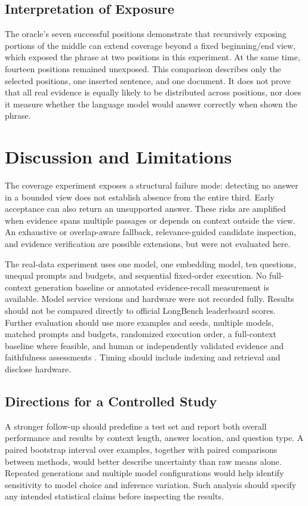 \documentclass[conference]{IEEEtran}
\begin{document}
\subsection{Interpretation of Exposure}
The oracle's seven successful positions demonstrate that recursively exposing portions of the middle can extend coverage beyond a fixed beginning/end view, which exposed the phrase at two positions in this experiment. At the same time, fourteen positions remained unexposed. This comparison describes only the selected positions, one inserted sentence, and one document. It does not prove that all real evidence is equally likely to be distributed across positions, nor does it measure whether the language model would answer correctly when shown the phrase.

\section{Discussion and Limitations}
The coverage experiment exposes a structural failure mode: detecting no answer in a bounded view does not establish absence from the entire third. Early acceptance can also return an unsupported answer. These risks are amplified when evidence spans multiple passages or depends on context outside the view. An exhaustive or overlap-aware fallback, relevance-guided candidate inspection, and evidence verification are possible extensions, but were not evaluated here.

The real-data experiment uses one model, one embedding model, ten questions, unequal prompts and budgets, and sequential fixed-order execution. No full-context generation baseline or annotated evidence-recall measurement is available. Model service versions and hardware were not recorded fully. Results should not be compared directly to official LongBench leaderboard scores. Further evaluation should use more examples and seeds, multiple models, matched prompts and budgets, randomized execution order, a full-context baseline where feasible, and human or independently validated evidence and faithfulness assessments \cite{beir,ares}. Timing should include indexing and retrieval and disclose hardware.

\subsection{Directions for a Controlled Study}
A stronger follow-up should predefine a test set and report both overall performance and results by context length, answer location, and question type. A paired bootstrap interval over examples, together with paired comparisons between methods, would better describe uncertainty than raw means alone. Repeated generations and multiple model configurations would help identify sensitivity to model choice and inference variation. Such analysis should specify any intended statistical claims before inspecting the results.
\end{document}

